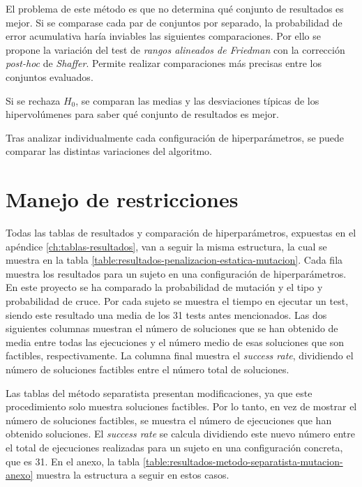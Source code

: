 El problema de este método es que no determina qué conjunto de resultados es mejor. Si se comparase cada par de conjuntos por separado, la probabilidad de error acumulativa haría inviables las siguientes comparaciones. Por ello se propone la variación del test de \textit{rangos alineados de Friedman} con la corrección \textit{post-hoc} de \textit{Shaffer}. Permite realizar comparaciones más precisas entre los conjuntos evaluados.~\cite{stac2024shaffer}

Si se rechaza \(H_0\), se comparan las medias y las desviaciones típicas de los hipervolúmenes para saber qué conjunto de resultados es mejor.

Tras analizar individualmente cada configuración de hiperparámetros, se puede comparar las distintas variaciones del algoritmo.

\section{Manejo de restricciones}
\label{ch:manejo-restricciones-experimentacion}

Todas las tablas de resultados y comparación de hiperparámetros, expuestas en el apéndice \ref{ch:tablas-resultados}, van a seguir la misma estructura, la cual se muestra en la tabla \ref{table:resultados-penalizacion-estatica-mutacion}. Cada fila muestra los resultados para un sujeto en una configuración de hiperparámetros. En este proyecto se ha comparado la probabilidad de mutación y el tipo y probabilidad de cruce. Por cada sujeto se muestra el tiempo en ejecutar un test, siendo este resultado una media de los 31 tests antes mencionados. Las dos siguientes columnas muestran el número de soluciones que se han obtenido de media entre todas las ejecuciones y el número medio de esas soluciones que son factibles, respectivamente. La columna final muestra el \textit{success rate}, dividiendo el número de soluciones factibles entre el número total de soluciones.

Las tablas del método separatista presentan modificaciones, ya que este procedimiento solo muestra soluciones factibles. Por lo tanto, en vez de mostrar el número de soluciones factibles, se muestra el número de ejecuciones que han obtenido soluciones. El \textit{success rate} se calcula dividiendo este nuevo número entre el total de ejecuciones realizadas para un sujeto en una configuración concreta, que es 31. En el anexo, la tabla \ref{table:resultados-metodo-separatista-mutacion-anexo} muestra la estructura a seguir en estos casos.

